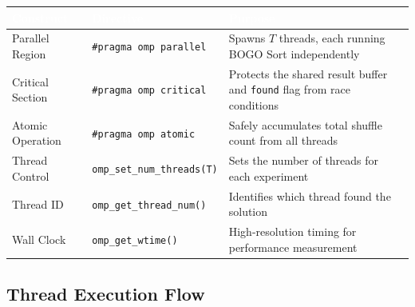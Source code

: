 \documentclass[11pt]{article}
\begin{document}
\begin{center}
\sffamily\small
\begin{tabular}{@{}llp{7.5cm}@{}}
\toprule
\rowcolor{tableheader}
\textcolor{white}{\textbf{Construct}} & \textcolor{white}{\textbf{Directive}} & \textcolor{white}{\textbf{Purpose}} \\
\midrule
\rowcolor{rowalt}
Parallel Region & \texttt{\#pragma omp parallel} & Spawns $T$ threads, each running BOGO Sort independently \\
Critical Section & \texttt{\#pragma omp critical} & Protects the shared result buffer and \texttt{found} flag from race conditions \\
\rowcolor{rowalt}
Atomic Operation & \texttt{\#pragma omp atomic} & Safely accumulates total shuffle count from all threads \\
Thread Control & \texttt{omp\_set\_num\_threads(T)} & Sets the number of threads for each experiment \\
\rowcolor{rowalt}
Thread ID & \texttt{omp\_get\_thread\_num()} & Identifies which thread found the solution \\
Wall Clock & \texttt{omp\_get\_wtime()} & High-resolution timing for performance measurement \\
\bottomrule
\end{tabular}
\end{center}

\subsection{Thread Execution Flow}
\end{document}

